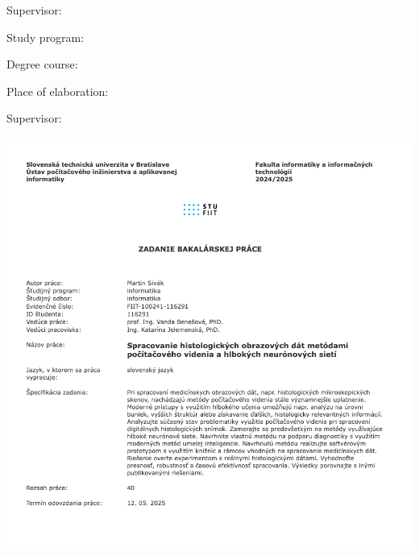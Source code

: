 


Supervisor: \mySupervisor

\medskip{}
\myDate


\newpage
\thispagestyle{empty}
\mbox{}
\newpage





Study program: \myStudyProgram

Degree course: \myDegreeCourse

Place of elaboration: \myInstitute

Supervisor: \mySupervisor

\medskip{}

\myDate


\newpage
\thispagestyle{empty}
\mbox{}
\newpage

\includegraphics[width=\paperwidth]{assets/images/task-desc.png}
\restoregeometry %
\newpage
\thispagestyle{empty}
\mbox{}
\newpage

